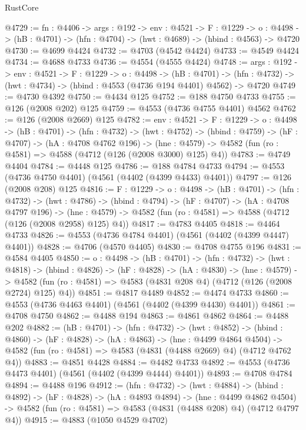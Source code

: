 \begin{lexlean}{RustCore}
\begin{coremodule}
@4729 := {fn : @4406} ->
  {args : @192} ->
  {env : @4521} ->
  {F : @1229} ->
  {o : @4498} -> (hB : @4701) -> (hfn : @4704) -> (hwt : @4689) -> (hbind : @4563) -> @4720
@4730 := @4699 @4424
@4732 := @4703 (@4542 @4424)
@4733 := @4549 @4424
@4734 := @4688 @4733
@4736 := @4554 (@4555 @4424)
@4748 := {args : @192} ->
  {env : @4521} ->
  {F : @1229} ->
  {o : @4498} ->
  (hB : @4701) ->
  (hfn : @4732) -> (hwt : @4734) -> (hbind : @4553 (@4736 @194 @4401) @4562) -> @4720
@4749 := @4730 @4392
@4750 := @4434 @125
@4752 := @188 @4750 @4733
@4755 := @126 (@2008 @202) @125
@4759 := @4553 (@4736 @4755 @4401) @4562
@4762 := @126 (@2008 @2669) @125
@4782 := {env : @4521} ->
  {F : @1229} ->
  {o : @4498} ->
  (hB : @4701) ->
  (hfn : @4732) ->
  (hwt : @4752) ->
  (hbind : @4759) ->
  (hF : @4707) ->
  (hA : @4708 @4762 @196) ->
  (hne : @4579) -> @4582 (fun (ro : @4581) => @4588 (@4712 (@126 (@2008 @3000) @125) @4))
@4783 := @4749 @4404
@4784 := @4448 @125
@4786 := @188 @4784 @4733
@4794 := @4553 (@4736 @4750 @4401) (@4561 (@4402 (@4399 @4433) @4401))
@4797 := @126 (@2008 @208) @125
@4816 := {F : @1229} ->
  {o : @4498} ->
  (hB : @4701) ->
  (hfn : @4732) ->
  (hwt : @4786) ->
  (hbind : @4794) ->
  (hF : @4707) ->
  (hA : @4708 @4797 @196) ->
  (hne : @4579) -> @4582 (fun (ro : @4581) => @4588 (@4712 (@126 (@2008 @2958) @125) @4))
@4817 := @4783 @4405
@4818 := @4464 @4733
@4826 := @4553 (@4736 @4784 @4401) (@4561 (@4402 (@4399 @4447) @4401))
@4828 := @4706 (@4570 @4405)
@4830 := @4708 @4755 @196
@4831 := @4584 @4405
@4850 := {o : @4498} ->
  (hB : @4701) ->
  (hfn : @4732) ->
  (hwt : @4818) ->
  (hbind : @4826) ->
  (hF : @4828) ->
  (hA : @4830) ->
  (hne : @4579) ->
  @4582 (fun (ro : @4581) => @4583 (@4831 @208 @4) (@4712 (@126 (@2008 @2724) @125) @4))
@4851 := @4817 @4489
@4852 := @4474 @4733
@4860 := @4553 (@4736 @4463 @4401) (@4561 (@4402 (@4399 @4430) @4401))
@4861 := @4708 @4750
@4862 := @4488 @194
@4863 := @4861 @4862
@4864 := @4488 @202
@4882 := (hB : @4701) ->
  (hfn : @4732) ->
  (hwt : @4852) ->
  (hbind : @4860) ->
  (hF : @4828) ->
  (hA : @4863) ->
  (hne : @4499 @4864 @4504) ->
  @4582 (fun (ro : @4581) => @4583 (@4831 (@4488 @2669) @4) (@4712 @4762 @4))
@4883 := @4851 @4428
@4884 := @4482 @4733
@4892 := @4553 (@4736 @4473 @4401) (@4561 (@4402 (@4399 @4444) @4401))
@4893 := @4708 @4784
@4894 := @4488 @196
@4912 := (hfn : @4732) ->
  (hwt : @4884) ->
  (hbind : @4892) ->
  (hF : @4828) ->
  (hA : @4893 @4894) ->
  (hne : @4499 @4862 @4504) ->
  @4582 (fun (ro : @4581) => @4583 (@4831 (@4488 @208) @4) (@4712 @4797 @4))
@4915 := @4883 (@1050 @4529 @4702)

\end{coremodule}
\end{lexlean}

